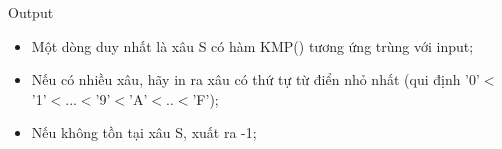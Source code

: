 Output
\begin{itemize}
	\item     Một dòng duy nhất là xâu S có hàm KMP() tương ứng trùng với input;   
	\item     Nếu có nhiều xâu, hãy in ra xâu có thứ tự từ điển nhỏ nhất (qui định '0'$<$'1'$<$...$<$'9'$<$'A'$<$..$<$'F');   
	\item     Nếu không tồn tại xâu S, xuất ra -1;   
\end{itemize}